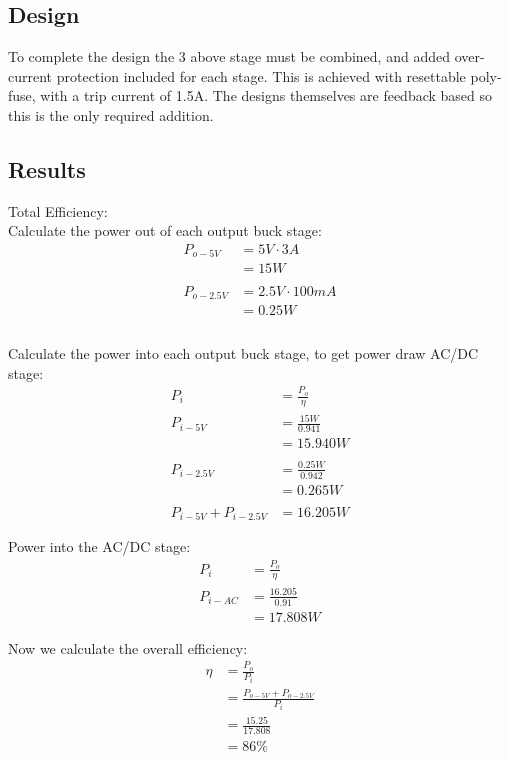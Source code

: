\documentclass[11pt, a4]{article}
\begin{document}
\subsection{Design}
To complete the design the 3 above stage must be combined, and added over-current protection included for each stage. This is achieved with resettable poly-fuse, with a trip current of 1.5A. The designs themselves are feedback based so this is the only required addition.
\subsection{Results}
Total Efficiency: \\
Calculate the power out of each output buck stage:
\begin{align*}
    P_{o-5V}   &= 5V \cdot 3A\\
                 &= 15W\\\\
    P_{o-2.5V} &= 2.5V \cdot 100mA\\
                 &= 0.25W\\\\
\end{align*}

Calculate the power into each output buck stage, to get power draw AC/DC stage:
\begin{align*}
    P_{i}      &= \frac{P_o}{\eta}\\
    P_{i-5V}   &= \frac{15W}{0.941}\\
                &= 15.940W\\\\
    P_{i-2.5V} &= \frac{0.25W}{0.942}\\
                &= 0.265W\\\\
    P_{i-5V} + P_{i-2.5V} &= 16.205W
\end{align*}

Power into the AC/DC stage:
\begin{align*}
    P_{i}      &= \frac{P_o}{\eta}\\
    P_{i-AC}   &= \frac{16.205}{0.91} \\
                &= 17.808W
\end{align*}

Now we calculate the overall efficiency:
\begin{align*}
    \eta &= \frac{P_o}{P_i} \\
         &= \frac{P_{o-5V}+ P_{o-2.5V}}{P_i} \\
         &= \frac{15.25}{17.808} \\
         &= 86\%
\end{align*}
\end{document}
